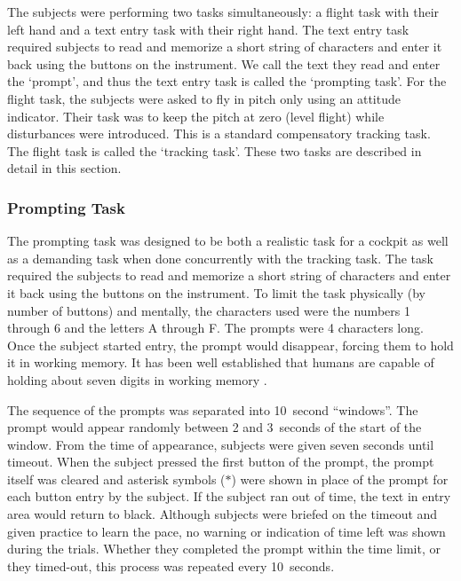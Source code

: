 The subjects were performing two tasks simultaneously: a flight task with their left hand and a text entry task with their right hand.
The text entry task required subjects to read and memorize a short string of characters and enter it back using the buttons on the instrument.
We call the text they read and enter the `prompt', and thus the text entry task is called the `prompting task'.
For the flight task, the subjects were asked to fly in pitch only using an attitude indicator.
Their task was to keep the pitch at zero (level flight) while disturbances were introduced.
This is a standard compensatory tracking task.
The flight task is called the `tracking task'.
These two tasks are described in detail in this section.

\subsubsection{Prompting Task}

The prompting task was designed to be both a realistic task for a cockpit as well as a demanding task when done concurrently with the tracking task.
The task required the subjects to read and memorize a short string of characters and enter it back using the buttons on the instrument.
To limit the task physically (by number of buttons) and mentally, the characters used were the numbers 1 through 6 and the letters A through F.
The prompts were 4 characters long.
Once the subject started entry, the prompt would disappear, forcing them to hold it in working memory.
It has been well established that humans are capable of holding about seven digits in working memory \citep{miller_magical_1956,baddeley_working_1992}.

The sequence of the prompts was separated into 10~second ``windows''.
The prompt would appear randomly between 2 and 3~seconds of the start of the window.
From the time of appearance, subjects were given seven seconds until timeout.
When the subject pressed the first button of the prompt, the prompt itself was cleared and asterisk symbols ($*$) were shown in place of the prompt for each button entry by the subject.
If the subject ran out of time, the text in entry area would return to black.
Although subjects were briefed on the timeout and given practice to learn the pace, no warning or indication of time left was shown during the trials.
Whether they completed the prompt within the time limit, or they timed-out, this process was repeated every 10~seconds.

